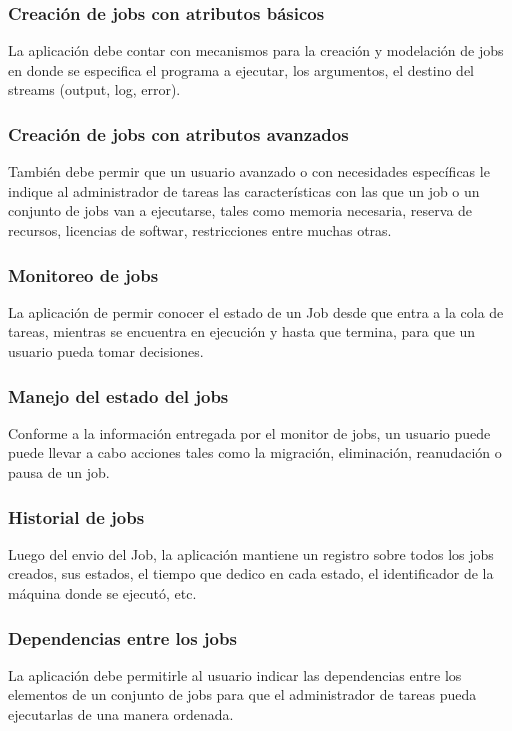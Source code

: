 \subsubsection{Creación de jobs con atributos básicos}
La aplicación debe contar con mecanismos para la creación y modelación de jobs en donde se especifica el programa a ejecutar, los argumentos, el destino del streams (output, log, error).

\subsubsection{Creación de jobs con atributos avanzados}
También debe permir que un usuario avanzado o con necesidades específicas le indique al administrador de tareas las características con las que un job o un conjunto de jobs van a ejecutarse, tales como memoria necesaria, reserva de recursos, licencias de softwar, restricciones entre muchas otras.

\subsubsection{Monitoreo de jobs}
La aplicación de permir conocer el estado de un Job desde que entra a la cola de tareas, mientras se encuentra en ejecución y hasta que termina, para que un usuario pueda tomar decisiones.

\subsubsection{Manejo del estado del jobs}
Conforme a la información entregada por el monitor de jobs, un usuario puede puede llevar a cabo acciones tales como la migración, eliminación, reanudación o pausa de un job.

\subsubsection{Historial de jobs}
Luego del envio del Job, la aplicación mantiene un registro sobre todos los jobs creados, sus estados, el tiempo que dedico en cada estado, el identificador de la máquina donde se ejecutó, etc.

\subsubsection{Dependencias entre los jobs}
La aplicación debe permitirle al usuario indicar las dependencias entre los elementos de un conjunto de jobs para que el administrador de tareas pueda ejecutarlas de una manera ordenada.

